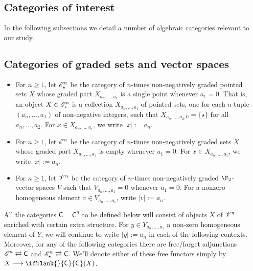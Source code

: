 \documentclass[11pt]{article}
\newcommand{\GS}[1]{\scrE^{#1}}
\newcommand{\GpS}[1]{\scrE^{#1}_\star}
\newcommand{\GR}[1]{\scrV^{#1}}%
\newcommand{\Fr}[2][]{\ifblank{#1}{#2}{#2_{#1}}}
\newcommand{\deltaAlgebra}{\Delta}
\begin{document}
\begin{SteenrodAlgebrasAndTheirKoszulDuals}
\end{SteenrodAlgebrasAndTheirKoszulDuals}

\begin{CategoriesOfInterest}
\section{Categories of interest}
In the following subsections we detail a number of algebraic categories relevant to our study.
\subsection{Categories of graded sets and vector spaces}
\begin{itemize}
\setlength{\parindent}{.25in}
\item For $n\geq1$, let $\GpS{n}$ be the category of $n$-times non-negatively graded pointed sets $X$ whose graded part $X_{a_n,\ldots,a_1}$ is a single point whenever $a_1=0$. That is, an object $X\in\GpS{n}$ is a collection $X_{a_n,\ldots,a_1}$ of pointed sets, one for each $n$-tuple $(a_n,\ldots,a_1)$ of non-negative integers, such that $X_{a_n,\ldots,a_2,0}=\{\star\}$ for all $a_n,\ldots,a_2$. For $x\in X_{a_n,\ldots,a_1}$, we write $|x|:=a_n$.
\item For $n\geq1$, let $\GS{n}$ be the category of $n$-times non-negatively graded sets $X$ whose graded part $X_{a_n,\ldots,a_1}$ is empty whenever $a_1=0$. For $x\in X_{a_n,\ldots,a_1}$, we write $|x|:=a_n$.

\item For $n\geq1$, let $\GR{n}$ be the category of $n$-times non-negatively graded $\F_2$-vector spaces $V$ such that $V_{a_n,\ldots,a_1}=0$ whenever $a_1=0$.  For a nonzero homogeneous element $v\in V_{a_n,\ldots,a_1}$, write $|v|:=a_n$.
\end{itemize}
All the categories $\mathsf{C}=\mathsf{C}^n$ to be defined below will consist of objects $X$ of $\GR{n}$ enriched with certain extra structure. For $y\in Y_{a_n,\ldots,a_1}$ a non-zero homogeneous element of $Y$, we will continue to write $|y|:=a_n$ in each of the following contexts.
Moreover, for any of the following categories there are free/forget adjunctions $\GS{n} \rightleftarrows \mathsf{C}$ and $\GpS{n} \rightleftarrows \mathsf{C}$. We'll denote either of these free functors simply by $X\mapsto\Fr{\mathsf{C}}(X)$.



\end{CategoriesOfInterest}
\end{document}
